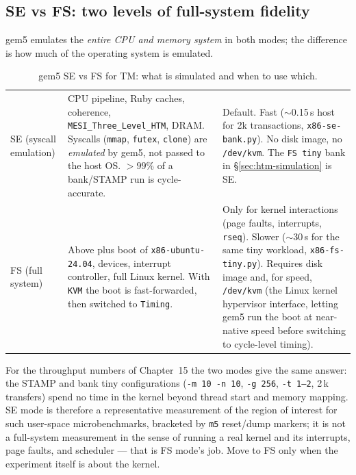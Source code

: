 \subsection{SE vs FS: two levels of full-system fidelity}
\label{sec:se-vs-fs}

gem5 emulates the \emph{entire CPU and memory system} in both modes; the difference is how much of the operating system is emulated.

\begin{table}[htbp]
\centering
\caption{gem5 SE vs FS for TM: what is simulated and when to use which.}
\label{tab:se-vs-fs}
\begin{tabular}{M{0.18\textwidth}M{0.38\textwidth}M{0.36\textwidth}}
\hline
{} &  &  \\
\hline
SE (syscall emulation) & CPU pipeline, Ruby caches, coherence, \texttt{MESI\_Three\_Level\_HTM}, DRAM. Syscalls (\texttt{mmap}, \texttt{futex}, \texttt{clone}) are \emph{emulated} by gem5, not passed to the host OS. $>99\%$ of a bank/STAMP run is cycle-accurate. & Default. Fast ($\sim$0.15\,s host for 2k transactions, \texttt{x86-se-bank.py}). No disk image, no \texttt{/dev/kvm}. The \texttt{FS tiny} bank in \S\ref{sec:htm-simulation} is SE. \\
FS (full system) & Above plus boot of \texttt{x86-ubuntu-24.04}, devices, interrupt controller, full Linux kernel. With \texttt{KVM} the boot is fast-forwarded, then switched to \texttt{Timing}. & Only for kernel interactions (page faults, interrupts, \texttt{rseq}). Slower ($\sim$30\,s for the same tiny workload, \texttt{x86-fs-tiny.py}). Requires disk image and, for speed, \texttt{/dev/kvm} (the Linux kernel hypervisor interface, letting gem5 run the boot at near-native speed before switching to cycle-level timing). \\
\hline
\end{tabular}
\end{table}

For the throughput numbers of Chapter~15 the two modes give the same answer: the STAMP and bank tiny configurations (\texttt{-m 10 -n 10}, \texttt{-g 256}, \texttt{-t 1--2}, 2\,k transfers) spend no time in the kernel beyond thread start and memory mapping. SE mode is therefore a representative measurement of the region of interest for such user-space microbenchmarks, bracketed by \texttt{m5} reset/dump markers; it is not a full-system measurement in the sense of running a real kernel and its interrupts, page faults, and scheduler --- that is FS mode's job. Move to FS only when the experiment itself is about the kernel.



